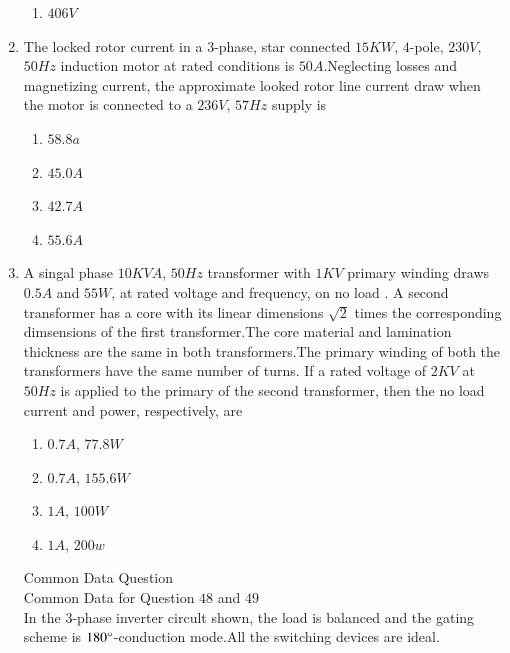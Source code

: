 \documentclass[journal]{IEEEtran}
\begin{document}
\begin{enumerate}
\begin{enumerate}
        \item$406 V$
    \end{enumerate}
    \item The locked rotor current in a $3$-phase, star connected $15 KW$, $4$-pole, $230 V$, $50Hz$ induction motor at rated conditions is $50 A$.Neglecting losses and magnetizing current, the approximate looked rotor line  current draw when the motor is connected to a $236 V$, $57 Hz$ supply is\\
    \begin{enumerate}
        \item$58.8 a$\\
        \item$45.0 A$\\
        \item$42.7 A$\\
        \item$55.6 A$
    \end{enumerate}
    \item A singal phase $10 KV A$, $50 Hz$ transformer with $1 KV$ primary winding draws $0.5 A$ and $55 W$, at rated voltage and frequency, on no load . A second transformer has a core with its linear dimensions $\sqrt{2}$ times the corresponding dimsensions of the first transformer.The core material and lamination thickness are the same in both transformers.The primary winding of both the transformers have the same number of turns. If a rated voltage of $2 KV$ at $50 Hz$ is applied to the primary of the second transformer, then the no load current and power, respectively, are\\
    \begin{enumerate}
        \item$0.7 A$, $77.8 W$\\
        \item$0.7 A$, $155.6 W$\\
        \item$1 A$, $100 W$\\
        \item$1 A$, $200 w$
    \end{enumerate}
    Common Data Question\\
    Common Data for Question $48$ and $49$\\
    In the 3-phase inverter circult shown, the load is balanced and the gating scheme is $180\degree$-conduction mode.All the switching devices are ideal.
    \begin{figure}[h!]
        \centering

\end{figure}
\end{enumerate}
\end{document}
